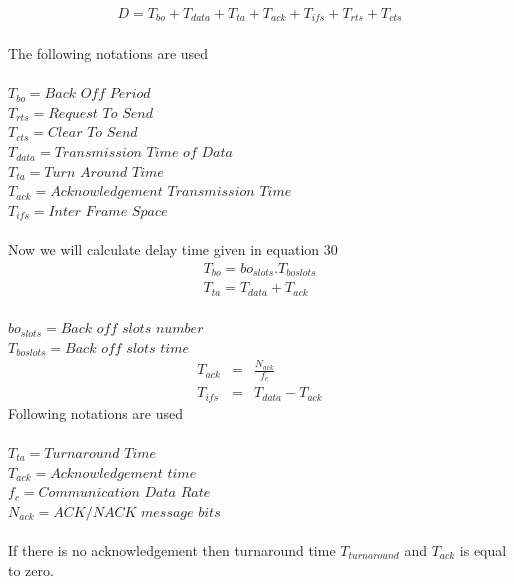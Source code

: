 \documentclass[11pt, conference, compsocconf, onecolumn]{IEEEtran}
\begin{document}
\begin{eqnarray}
D=T_{bo}+T_{data}+T_{ta}+T_{ack}+T_{ifs}+T_{rts}+T_{cts}
\end{eqnarray}
\\
The following notations are used
\\\\
$T_{bo}=Back$ $Off$ $Period$
\\
$T_{rts}=Request$ $To$ $Send$
\\
$T_{cts}=Clear$ $To$ $Send$
\\
$T_{data}=Transmission$ $Time$ $of$ $Data$
\\
$T_{ta}=Turn$ $Around$ $Time$
\\
$T_{ack}=Acknowledgement$ $Transmission$ $Time$
\\
$T_{ifs}=Inter$ $Frame$ $Space$
\\\\
Now we will calculate delay time given in equation 30
\begin{eqnarray}
T_{bo}=bo_{slots}.T_{boslots}
\\
T_{ta}=T_{data} + T_{ack}
\end{eqnarray}
\\
$bo_{slots}=Back$ $off$ $slots$ $number$
\\
$T_{boslots}=Back$ $off$ $slots$ $time$
\\
\begin{eqnarray}
T_{ack}&=&\frac{N_{ack}}{f_{c}}
\\
T_{ifs}&=&T_{data}-T_{ack}
\end{eqnarray}
Following notations are used
\\\\
$T_{ta}=Turnaround$ $Time$
\\
$T_{ack}=Acknowledgement$ $time$
\\
$f_{c}= Communication$ $Data$ $Rate$
\\
$N_{ack}=ACK/NACK$ $message$ $bits$
\\\\
\indent If there is no acknowledgement then turnaround time $T_{turnaround}$ and $T_{ack}$ is equal to zero.
\\
\end{document}
